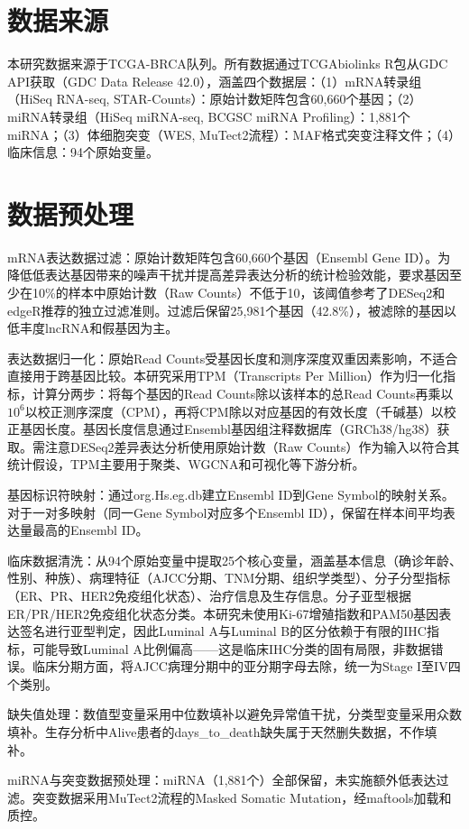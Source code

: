 \documentclass[12pt,a4paper,openany]{ctexbook}
\begin{document}
\section{数据来源}
本研究数据来源于TCGA-BRCA队列。所有数据通过TCGAbiolinks R包\cite{colaprico2016tcgabiolinks}从GDC API获取（GDC Data Release 42.0），涵盖四个数据层：（1）mRNA转录组（HiSeq RNA-seq, STAR-Counts）：原始计数矩阵包含60,660个基因；（2）miRNA转录组（HiSeq miRNA-seq, BCGSC miRNA Profiling）：1,881个miRNA；（3）体细胞突变（WES, MuTect2流程）：MAF格式突变注释文件；（4）临床信息：94个原始变量。

\section{数据预处理}
mRNA表达数据过滤：原始计数矩阵包含60,660个基因（Ensembl Gene ID）。为降低低表达基因带来的噪声干扰并提高差异表达分析的统计检验效能，要求基因至少在10\%的样本中原始计数（Raw Counts）不低于10，该阈值参考了DESeq2和edgeR推荐的独立过滤准则。过滤后保留25,981个基因（42.8\%），被滤除的基因以低丰度lncRNA和假基因为主。

表达数据归一化：原始Read Counts受基因长度和测序深度双重因素影响，不适合直接用于跨基因比较。本研究采用TPM（Transcripts Per Million）作为归一化指标，计算分两步：将每个基因的Read Counts除以该样本的总Read Counts再乘以$10^6$以校正测序深度（CPM），再将CPM除以对应基因的有效长度（千碱基）以校正基因长度。基因长度信息通过Ensembl基因组注释数据库（GRCh38/hg38）获取。需注意DESeq2差异表达分析使用原始计数（Raw Counts）作为输入以符合其统计假设，TPM主要用于聚类、WGCNA和可视化等下游分析。

基因标识符映射：通过org.Hs.eg.db建立Ensembl ID到Gene Symbol的映射关系。对于一对多映射（同一Gene Symbol对应多个Ensembl ID），保留在样本间平均表达量最高的Ensembl ID。

临床数据清洗：从94个原始变量中提取25个核心变量，涵盖基本信息（确诊年龄、性别、种族）、病理特征（AJCC分期、TNM分期、组织学类型）、分子分型指标（ER、PR、HER2免疫组化状态）、治疗信息及生存信息。分子亚型根据ER/PR/HER2免疫组化状态分类。本研究未使用Ki-67增殖指数和PAM50基因表达签名进行亚型判定，因此Luminal A与Luminal B的区分依赖于有限的IHC指标，可能导致Luminal A比例偏高——这是临床IHC分类的固有局限，非数据错误。临床分期方面，将AJCC病理分期中的亚分期字母去除，统一为Stage I至IV四个类别。

缺失值处理：数值型变量采用中位数填补以避免异常值干扰，分类型变量采用众数填补。生存分析中Alive患者的days\_to\_death缺失属于天然删失数据，不作填补。

miRNA与突变数据预处理：miRNA（1,881个）全部保留，未实施额外低表达过滤。突变数据采用MuTect2流程的Masked Somatic Mutation，经maftools\cite{mayakonda2018maftools}加载和质控。
\end{document}
